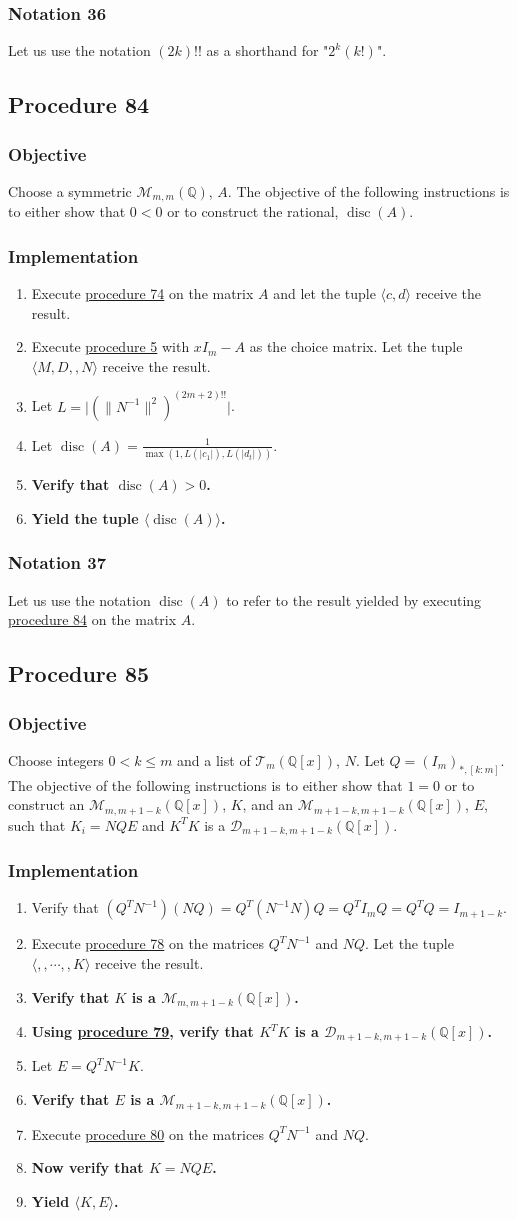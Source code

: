\documentclass[twocolumn]{article}
\DeclareMathOperator{\disc}{disc}
\newcommand{\notation}[1]{\subsubsection*{Notation #1}}
\newcommand{\procedure}[2][]{\subsection*{Procedure #2 \ifthenelse{\equal{#1}{}}{}{(#1)}}\label{sec:procedure #2}}
\newcommand{\objective}{\subsubsection*{Objective}}
\newcommand{\implementation}{\subsubsection*{Implementation}}
\begin{document}
		\notation{36}
			Let us use the notation $(2k)!!$ as a shorthand for "$2^k(k!)$".
		\procedure{84}
			\objective
				Choose a symmetric $\mathcal{M}_{m,m}(\mathbb{Q})$, $A$. The objective of the following instructions is to either show that $0<0$ or to construct the rational, $\disc(A)$.
			\implementation
				\begin{enumerate}
					\item Execute \hyperref[sec:procedure 74]{procedure 74} on the matrix $A$ and let the tuple $\langle c,d\rangle$ receive the result.
					\item Execute \hyperref[sec:procedure 5]{procedure 5} with $xI_m-A$ as the choice matrix. Let the tuple $\langle M,D,,N\rangle$ receive the result.
					\item Let $L=\lvert(\lVert N^{-1}\rVert^2)^{(2m+2)!!}\rvert$.
					\item Let $\disc(A)=\frac{1}{\max(1,L(\lvert c_1\rvert),L(\lvert d_t\rvert))}$.
					\item \textbf{Verify that $\disc(A)>0$.}
					\item \textbf{Yield the tuple $\langle\disc(A)\rangle$.}
				\end{enumerate}
		\notation{37}
			Let us use the notation $\disc(A)$ to refer to the result yielded by executing \hyperref[sec:procedure 84]{procedure 84} on the matrix $A$.
		\procedure{85}
			\objective
				Choose integers $0<k\le m$ and a list of $\mathcal{T}_m(\mathbb{Q}[x])$, $N$. Let $Q=(I_m)_{*,[k:m]}$. The objective of the following instructions is to either show that $1=0$ or to construct an $\mathcal{M}_{m,m+1-k}(\mathbb{Q}[x])$, $K$, and an $\mathcal{M}_{m+1-k,m+1-k}(\mathbb{Q}[x])$, $E$, such that $K_i=NQE$ and $K^TK$ is a $\mathcal{D}_{m+1-k,m+1-k}(\mathbb{Q}[x])$.
			\implementation
				\begin{enumerate}
					\item Verify that $(Q^TN^{-1})(NQ)=Q^T(N^{-1}N)Q=Q^TI_mQ=Q^TQ=I_{m+1-k}$.
					\item Execute \hyperref[sec:procedure 78]{procedure 78} on the matrices $Q^TN^{-1}$ and $NQ$. Let the tuple $\langle ,,\cdots,,K\rangle$ receive the result.
					\item \textbf{Verify that $K$ is a $\mathcal{M}_{m,m+1-k}(\mathbb{Q}[x])$.}
					\item \textbf{Using \hyperref[sec:procedure 79]{procedure 79}, verify that $K^TK$ is a $\mathcal{D}_{m+1-k,m+1-k}(\mathbb{Q}[x])$.}
					\item Let $E=Q^TN^{-1}K$.
					\item \textbf{Verify that $E$ is a $\mathcal{M}_{m+1-k,m+1-k}(\mathbb{Q}[x])$.}
					\item Execute \hyperref[sec:procedure 80]{procedure 80} on the matrices $Q^TN^{-1}$ and $NQ$.
					\item \textbf{Now verify that $K=NQE$.}
					\item \textbf{Yield $\langle K,E\rangle$.}
				\end{enumerate}
\end{document}
